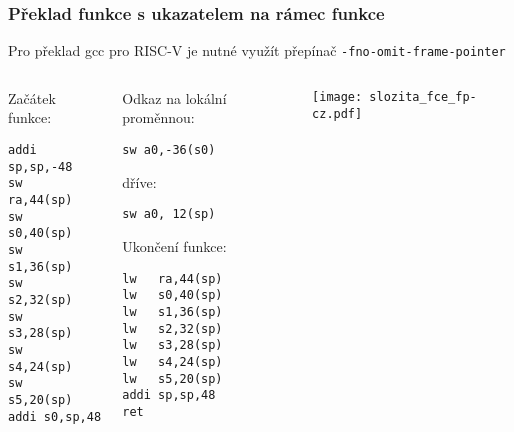 \documentclass{beamer}
\begin{document}
\begin{frame}[fragile,shrink=5]
\frametitle{Překlad funkce s ukazatelem na rámec funkce}

Pro překlad gcc pro RISC-V je nutné využít přepínač \texttt{-fno-omit-frame-pointer}
\begin{columns}
\begin{column}{0.25\textwidth}
Začátek funkce:

\begin{verbatim}
addi sp,sp,-48
sw   ra,44(sp)
sw   s0,40(sp)
sw   s1,36(sp)
sw   s2,32(sp)
sw   s3,28(sp)
sw   s4,24(sp)
sw   s5,20(sp)
addi s0,sp,48
\end{verbatim}
\end{column}   
\begin{column}{0.4\textwidth}
Odkaz na lokální proměnnou:

\begin{verbatim}
sw a0,-36(s0)
\end{verbatim}
dříve:
\begin{verbatim}
sw a0, 12(sp)
\end{verbatim}



Ukončení funkce:

\begin{verbatim}
lw   ra,44(sp)
lw   s0,40(sp)
lw   s1,36(sp)
lw   s2,32(sp)
lw   s3,28(sp)
lw   s4,24(sp)
lw   s5,20(sp)
addi sp,sp,48
ret
\end{verbatim}
\end{column}
\begin{column}{0.35\textwidth}  
\texttt{[image: slozita\_fce\_fp-cz.pdf]}
\end{column}
\end{columns}
\end{frame}
\end{document}
